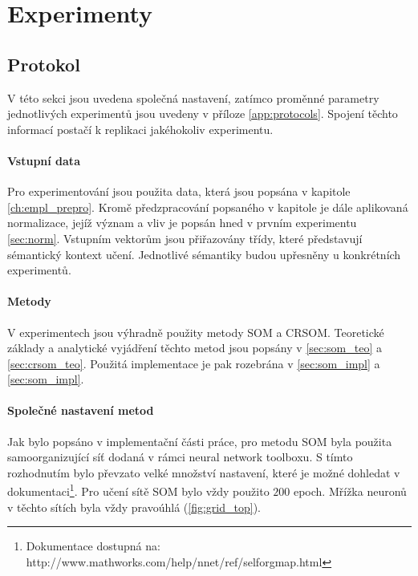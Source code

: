 \documentclass[thesis=M,czech]{FITthesis}[2012/06/26]
\begin{document}
\chapter{Experimenty}\label{ch:experiments}
\section{Protokol}

V této sekci jsou uvedena společná nastavení, zatímco proměnné parametry jednotlivých experimentů jsou uvedeny v příloze \ref{app:protocols}. Spojení těchto informací postačí k replikaci jakéhokoliv experimentu.


\subsubsection*{Vstupní data}
Pro experimentování jsou použita data, která jsou popsána v kapitole \ref{ch:empl_prepro}. Kromě předzpracování popsaného v kapitole je dále aplikovaná normalizace, jejíž význam a vliv je popsán hned v prvním experimentu \ref{sec:norm}.
Vstupním vektorům jsou přiřazovány třídy, které představují sémantický kontext učení. Jednotlivé sémantiky budou upřesněny u konkrétních experimentů.


\subsubsection*{Metody}
V experimentech jsou výhradně použity metody SOM a CRSOM. Teoretické základy a analytické vyjádření těchto metod jsou popsány v \ref{sec:som_teo} a \ref{sec:crsom_teo}. Použitá implementace je pak rozebrána v \ref{sec:som_impl} a \ref{sec:som_impl}. 



\subsubsection*{Společné nastavení metod}
Jak bylo popsáno v implementační části práce, pro metodu SOM byla použita samoorganizující síť dodaná v rámci neural network toolboxu. S tímto rozhodnutím bylo převzato velké množství nastavení, které je možné dohledat v dokumentaci\footnote{Dokumentace dostupná na: http://www.mathworks.com/help/nnet/ref/selforgmap.html}. Pro učení sítě SOM bylo vždy použito $200$ epoch. Mřížka neuronů v těchto sítích byla vždy pravoúhlá (\ref{fig:grid_top}).
\end{document}
